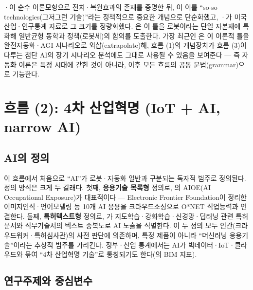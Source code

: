 \documentclass[11pt]{article}
\begin{document}
\textcite{acemoglu-2011-skills-tasks-and-technologies-implications}·\textcite{acemoglu-2018-the-race-between-man-and}이 순수 이론모형으로 전치·복원효과의 존재를 증명한 뒤, \textcite{acemoglu-2018-artificial-intelligence-automation-and}이 이를 ``so-so technologies(그저그런 기술)''라는 정책적으로 중요한 개념으로 단순화했고, \textcite{acemoglu-2019-automation-and-new-tasks-how}·\textcite{acemoglu-2022-tasks-automation-and-the-rise}가 미국 산업·인구통계 자료로 그 크기를 정량화했다. \textcite{humlum-2019-robot-adoption-and-labor-market}은 이 틀을 로봇이라는 단일 자본재에 특화해 일반균형 동학과 정책(로봇세)의 함의를 도출한다. 가장 최근인 \textcite{korinek-2024-scenarios-for-the-transition-to}은 이 이론적 틀을 완전자동화·AGI 시나리오로 외삽(extrapolate)해, 흐름 (1)의 개념장치가 흐름 (3)이 다루는 첨단 AI의 장기 시나리오 분석에도 그대로 사용될 수 있음을 보여준다 — 즉 자동화 이론은 특정 시대에 갇힌 것이 아니라, 이후 모든 흐름의 공통 문법(grammar)으로 기능한다.

\section{흐름 (2): 4차 산업혁명 (IoT + AI, narrow AI)}
\label{sec:era2}

\subsection{AI의 정의}

이 흐름에서 처음으로 ``AI''가 로봇·자동화 일반과 구분되는 독자적 범주로 정의된다. 정의 방식은 크게 두 갈래다. 첫째, \textbf{응용기술 목록형} 정의로, \textcite{felten-2021-occupational-industry-and-geographic-exposure}의 AIOE(AI Occupational Exposure)가 대표적이다 — Electronic Frontier Foundation이 정리한 이미지인식·언어모델링 등 10개 AI 응용을 크라우드소싱으로 O*NET 직업능력과 연결한다. 둘째, \textbf{특허텍스트형} 정의로, \textcite{webb-2020-impact-artificial-intelligence-labor}가 지도학습·강화학습·신경망·딥러닝 관련 특허문서와 직무기술서의 텍스트 중복도로 AI 노출을 식별한다. 이 두 정의 모두 인간(크라우드워커·특허심사관)의 사전 판단에 의존하며, 특정 제품이 아니라 ``머신러닝 응용기술''이라는 추상적 범주를 가리킨다. 정부·산업 통계에서는 AI가 빅데이터·IoT·클라우드와 묶여 ``4차 산업혁명 기술''로 통칭되기도 한다(\cite{kiet-2021-ai-adoption-productivity}의 BIM 지표).

\subsection{연구주제와 중심변수}
\end{document}
